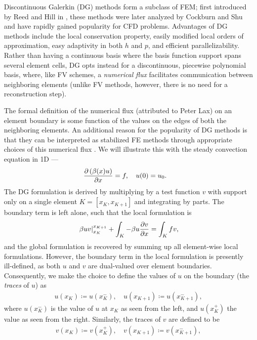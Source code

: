 Discontinuous Galerkin (DG) methods form a subclass of FEM; first introduced by Reed and Hill in \cite{Reed:73}, these methods were later analyzed by Cockburn and Shu \cite{CockburnShu:DG} and have rapidly gained popularity for CFD problems. Advantages of DG methods include the local conservation property, easily modified local orders of approximation, easy adaptivity in both $h$ and $p$, and efficient parallelizability. Rather than having a continuous basis where the basis function support spans several element cells, DG opts instead for a discontinuous, piecewise polynomial basis, where, like FV schemes, a \emph{numerical flux} facilitates communication between neighboring elements (unlike FV methods, however, there is no need for a reconstruction step). 

The formal definition of the numerical flux (attributed to Peter Lax) on an element boundary is some function of the values on the edges of both the neighboring elements.  An additional reason for the popularity of DG methods is that they can be interpreted as stabilized FE methods through appropriate choices of this numerical flux \cite{Brezzi20063293}. We will illustrate this with the steady convection equation in 1D ---
\begin{align*}
\pd{\left(\beta(x) u\right)}{x} = f, \quad u(0) &= u_0.
\end{align*}
The DG formulation is derived by multiplying by a test function $v$ with support only on a single element $K = [x_K,x_{K+1}]$ and integrating by parts. The boundary term is left alone, such that the local formulation is 
\[
\left.\beta u v\right|_{x_K}^{x_{K+1}} + \int_K -\beta u \pd{v}{x} = \int_K f v,
\]
and the global formulation is recovered by summing up all element-wise local formulations. However, the boundary term in the local formulation is presently ill-defined, as both $u$ and $v$ are dual-valued over element boundaries. Consequently, we make the choice to define the values of $u$ on the boundary (the \emph{traces} of $u$) as
\begin{align*}
u(x_K) \coloneqq u(x_K^-), \quad u(x_{K+1}) \coloneqq u(x_{K+1}^-),
\end{align*}
where $u(x_K^-)$ is the value of $u$ at $x_K$ as seen from the left, and $u(x_K^+)$ the value as seen from the right. Similarly, the traces of $v$ are defined to be
\begin{align*}
v(x_K) \coloneqq v(x_K^+), \quad v(x_{K+1}) \coloneqq v(x_{K+1}^-),
\end{align*}
